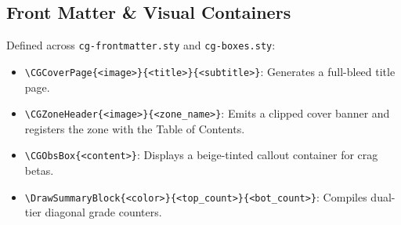 \subsection{Front Matter \& Visual Containers}
Defined across \texttt{cg-frontmatter.sty} and \texttt{cg-boxes.sty}:
\begin{itemize}
    \item \texttt{\textbackslash CGCoverPage\{<image>\}\{<title>\}\{<subtitle>\}}: Generates a full-bleed title page.
    \item \texttt{\textbackslash CGZoneHeader\{<image>\}\{<zone\_name>\}}: Emits a clipped cover banner and registers the zone with the Table of Contents.
    \item \texttt{\textbackslash CGObsBox\{<content>\}}: Displays a beige-tinted callout container for crag betas.
    \item \texttt{\textbackslash DrawSummaryBlock\{<color>\}\{<top\_count>\}\{<bot\_count>\}}: Compiles dual-tier diagonal grade counters.
\end{itemize}
